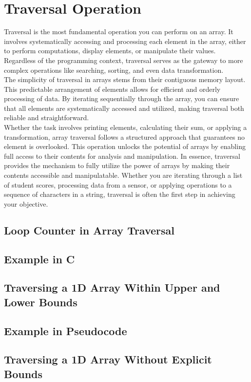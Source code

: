 \documentclass[12pt, oneside]{book}
\begin{document}
\section{Traversal Operation}
Traversal is the most fundamental operation you can perform on an array. It involves systematically accessing and processing each element in the array, either to perform computations, display elements, or manipulate their values. Regardless of the programming context, traversal serves as the gateway to more complex operations like searching, sorting, and even data transformation.\\The simplicity of traversal in arrays stems from their contiguous memory layout. This predictable arrangement of elements allows for efficient and orderly processing of data. By iterating sequentially through the array, you can ensure that all elements are systematically accessed and utilized, making traversal both reliable and straightforward.\\Whether the task involves printing elements, calculating their sum, or applying a transformation, array traversal follows a structured approach that guarantees no element is overlooked. This operation unlocks the potential of arrays by enabling full access to their contents for analysis and manipulation.  In essence, traversal provides the mechanism to fully utilize the power of arrays by making their contents accessible and manipulatable. Whether you are iterating through a list of student scores, processing data from a sensor, or applying operations to a sequence of characters in a string, traversal is often the first step in achieving your objective.
\subsection{Loop Counter in Array Traversal} 
\subsection{Example in C}
\subsection{Traversing a 1D Array Within Upper and Lower Bounds}
\subsection{ Example in Pseudocode}
\subsection{Traversing a 1D Array Without Explicit Bounds}
\end{document}
